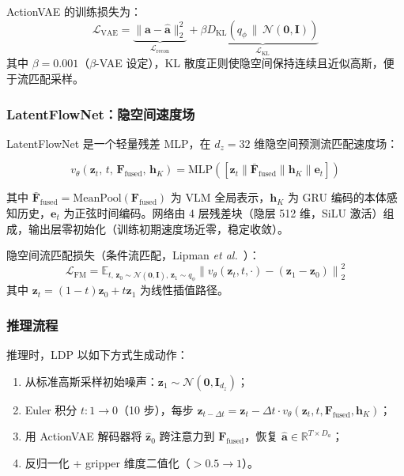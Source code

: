 \documentclass[10pt,twocolumn]{article}
\newcommand{\etal}{\textit{et al.}\xspace}
\begin{document}
ActionVAE 的训练损失为：
\begin{equation}
  \mathcal{L}_{\text{VAE}} = \underbrace{\|\mathbf{a} - \hat{\mathbf{a}}\|_2^2}_{\mathcal{L}_{\text{recon}}} + \beta \underbrace{D_{\text{KL}}\!\left(q_\phi \,\|\, \mathcal{N}(\mathbf{0},\mathbf{I})\right)}_{\mathcal{L}_{\text{KL}}}
  \label{eq:vae}
\end{equation}
其中 $\beta = 0.001$（$\beta$-VAE 设定），KL 散度正则使隐空间保持连续且近似高斯，便于流匹配采样。

\subsubsection{LatentFlowNet：隐空间速度场}

LatentFlowNet 是一个轻量残差 MLP，在 $d_z=32$ 维隐空间预测流匹配速度场：

\begin{equation}
  v_\theta(\mathbf{z}_t,\, t,\, \mathbf{F}_{\text{fused}},\, \mathbf{h}_K) = \text{MLP}\!\left([\mathbf{z}_t \| \bar{\mathbf{F}}_{\text{fused}} \| \mathbf{h}_K \| \mathbf{e}_t]\right)
  \label{eq:latentfm}
\end{equation}

其中 $\bar{\mathbf{F}}_{\text{fused}} = \text{MeanPool}(\mathbf{F}_{\text{fused}})$ 为 VLM 全局表示，$\mathbf{h}_K$ 为 GRU 编码的本体感知历史，$\mathbf{e}_t$ 为正弦时间编码。网络由 4 层残差块（隐层 512 维，SiLU 激活）组成，输出层零初始化（训练初期速度场近零，稳定收敛）。

隐空间流匹配损失（条件流匹配，Lipman \etal~\cite{flowmatching}）：
\begin{equation}
  \mathcal{L}_{\text{FM}} = \mathbb{E}_{t,\, \mathbf{z}_0 \sim \mathcal{N}(\mathbf{0},\mathbf{I}),\, \mathbf{z}_1 \sim q_\phi} \left\| v_\theta(\mathbf{z}_t, t, \cdot) - (\mathbf{z}_1 - \mathbf{z}_0) \right\|_2^2
  \label{eq:fm}
\end{equation}
其中 $\mathbf{z}_t = (1-t)\mathbf{z}_0 + t\mathbf{z}_1$ 为线性插值路径。

\subsubsection{推理流程}

推理时，LDP 以如下方式生成动作：
\begin{enumerate}[leftmargin=*, label=\textbf{\arabic*.}]
  \item 从标准高斯采样初始噪声：$\mathbf{z}_1 \sim \mathcal{N}(\mathbf{0}, \mathbf{I}_{d_z})$；
  \item Euler 积分 $t: 1 \to 0$（10 步），每步 $\mathbf{z}_{t - \Delta t} = \mathbf{z}_t - \Delta t \cdot v_\theta(\mathbf{z}_t, t, \mathbf{F}_{\text{fused}}, \mathbf{h}_K)$；
  \item 用 ActionVAE 解码器将 $\hat{\mathbf{z}}_0$ 跨注意力到 $\mathbf{F}_{\text{fused}}$，恢复 $\hat{\mathbf{a}} \in \mathbb{R}^{T \times D_a}$；
  \item 反归一化 + gripper 维度二值化（$> 0.5 \to 1$）。
\end{enumerate}
\end{document}
